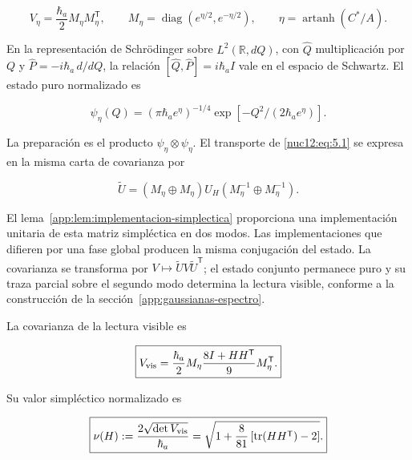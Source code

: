 \begin{equation}
V_\eta=\frac{\hbar_a}{2}M_\eta M_\eta^{\mathsf T},\qquad
M_\eta=\operatorname{diag}(e^{\eta/2},e^{-\eta/2}),\qquad
\eta=\operatorname{artanh}(C^*/A).
\label{nuc12:eq:5.4}
\end{equation}



En la representación de Schrödinger sobre \(L^2(\mathbb R,dQ)\), con \(\widehat Q\) multiplicación por \(Q\) y \(\widehat P=-i\hbar_a\,d/dQ\), la relación \([\widehat Q,\widehat P]=i\hbar_a I\) vale en el espacio de Schwartz. El estado puro normalizado es



\[
\psi_\eta(Q)=(\pi\hbar_a e^\eta)^{-1/4}
\exp[-Q^2/(2\hbar_a e^\eta)].
\]



La preparación es el producto \(\psi_\eta\otimes\psi_\eta\). El transporte de \eqref{nuc12:eq:5.1} se expresa en la misma carta de covarianza por



\begin{equation}
\widetilde U=(M_\eta\oplus M_\eta)U_H
(M_\eta^{-1}\oplus M_\eta^{-1}).
\label{nuc12:eq:5.5}
\end{equation}



El lema~\ref{app:lem:implementacion-simplectica} proporciona una implementación unitaria de esta matriz simpléctica en dos modos. Las implementaciones que difieren por una fase global producen la misma conjugación del estado. La covarianza se transforma por \(V\mapsto\widetilde U V\widetilde U^{\mathsf T}\); el estado conjunto permanece puro y su traza parcial sobre el segundo modo determina la lectura visible, conforme a la construcción de la sección~\ref{app:gaussianas-espectro}.

\begin{theorem}

La covarianza de la lectura visible es



\begin{equation}
\boxed{V_{\rm vis}=
\frac{\hbar_a}{2}M_\eta
\frac{8I+HH^{\mathsf T}}9
M_\eta^{\mathsf T}.}
\label{nuc12:eq:5.6}
\end{equation}



Su valor simpléctico normalizado es



\begin{equation}
\boxed{\nu(H):=\frac{2\sqrt{\det V_{\rm vis}}}{\hbar_a}
=\sqrt{1+\frac8{81}\left[\operatorname{tr}(HH^{\mathsf T})-2\right]}.}
\label{nuc12:eq:5.7}
\end{equation}
\end{theorem}



